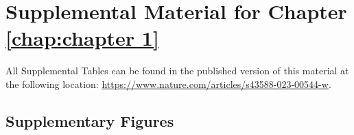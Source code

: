 \appendix{}

\chapter{Supplemental Material for Chapter \ref{chap:chapter 1}}

All Supplemental Tables can be found in the published version of this material at the following location: \href{https://www.nature.com/articles/s43588-023-00544-w}{https://www.nature.com/articles/s43588-023-00544-w}.

\section{Supplementary Figures}

